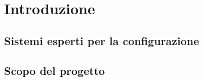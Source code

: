 \section{Introduzione}
\subsection{Sistemi esperti per la configurazione}
\lipsum

\subsection{Scopo del progetto}